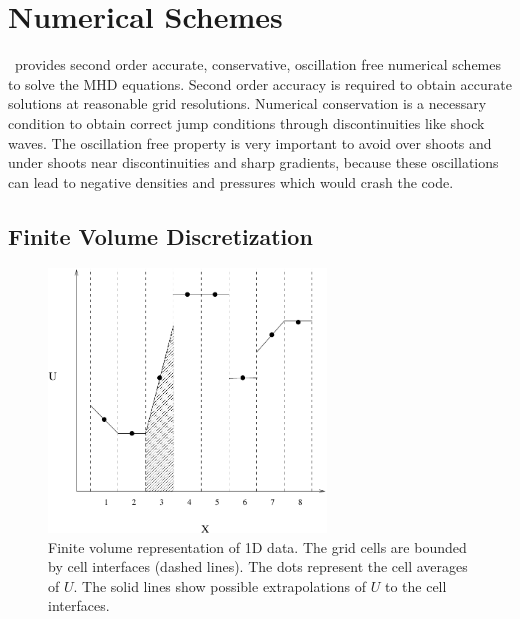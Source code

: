 %

\section{Numerical Schemes \label{section:numerical_schemes}}

\BATSRUS\ provides second order accurate, conservative, oscillation free
numerical schemes to solve the MHD equations. Second order accuracy
is required to obtain accurate solutions at reasonable grid resolutions.
Numerical conservation is a necessary condition to obtain correct 
jump conditions through discontinuities like shock waves. 
The oscillation free property is very important to avoid over shoots
and under shoots near discontinuities and sharp gradients, because
these oscillations can lead to negative densities and pressures which
would crash the code.

\subsection{Finite Volume Discretization \label{section:finite_volume}}

\begin{figure}
  \begin{center}
  \includegraphics[height=7cm]{fivol.pdf}
  \end{center}
   \caption{Finite volume representation of 1D data. The grid cells are
            bounded by cell interfaces (dashed lines).
            The dots represent the cell averages of $U$.
            The solid lines show possible extrapolations of $U$ to the
            cell interfaces.}
\label{fig:fivol}
\end{figure}

